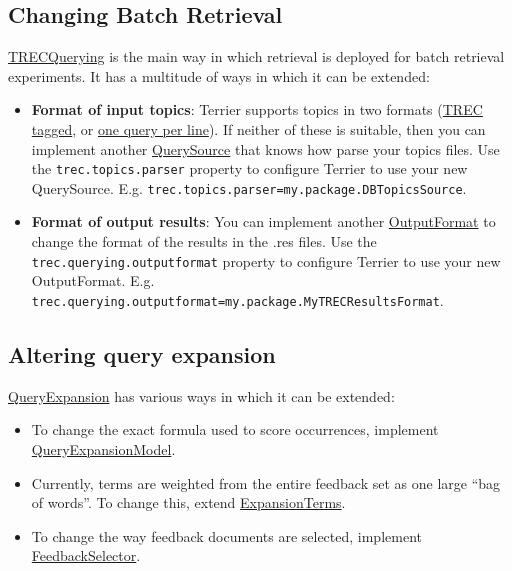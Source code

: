 \subsection{Changing Batch Retrieval}\label{changing-batch-retrieval}

\href{javadoc/org/terrier/applications/batchquerying/TRECQuerying.html}{TRECQuerying}
is the main way in which retrieval is deployed for batch retrieval
experiments. It has a multitude of ways in which it can be extended:

\begin{itemize}
\tightlist
\item
  \textbf{Format of input topics}: Terrier supports topics in two
  formats (\href{javadoc/org/terrier/structures/TRECQuery.html}{TREC
  tagged}, or
  \href{javadoc/org/terrier/structures/SingleLineTRECQuery.html}{one
  query per line}). If neither of these is suitable, then you can
  implement another
  \href{javadoc/org/terrier/applications/batchquerying/QuerySource.html}{QuerySource}
  that knows how parse your topics files. Use the
  \texttt{trec.topics.parser} property to configure Terrier to use your
  new QuerySource. E.g.
  \texttt{trec.topics.parser=my.package.DBTopicsSource}.
\item
  \textbf{Format of output results}: You can implement another
  \href{javadoc/org/terrier/structures/outputformat/OutputFormat.html}{OutputFormat}
  to change the format of the results in the .res files. Use the
  \texttt{trec.querying.outputformat} property to configure Terrier to
  use your new OutputFormat. E.g.
  \texttt{trec.querying.outputformat=my.package.MyTRECResultsFormat}.
\end{itemize}

\subsection{Altering query expansion}\label{altering-query-expansion}

\href{javadoc/org/terrier/querying/QueryExpansion.html}{QueryExpansion}
has various ways in which it can be extended:

\begin{itemize}
\tightlist
\item
  To change the exact formula used to score occurrences, implement
  \href{javadoc/org/terrier/matching/models/queryexpansion/QueryExpansionModel.html}{QueryExpansionModel}.
\item
  Currently, terms are weighted from the entire feedback set as one
  large ``bag of words''. To change this, extend
  \href{javadoc/org/terrier/querying/ExpansionTerms.html}{ExpansionTerms}.
\item
  To change the way feedback documents are selected, implement
  \href{javadoc/org/terrier/querying/FeedbackSelector.html}{FeedbackSelector}.
\end{itemize}

